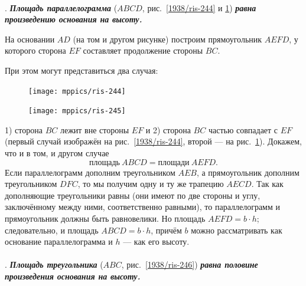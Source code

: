 \documentclass[twoside]{book}
\begin{document}
\paragraph{}\label{1938/247}
.
\textbf{\emph{Площадь параллелограмма}} ($ABCD$, рис.~\ref{1938/ris-244} и \ref{1938/ris-245}) \textbf{\emph{равна произведению основания на высоту.}}

На основании $AD$ (на том и другом рисунке) построим прямоугольник $AEFD$, у которого сторона $EF$ составляет продолжение стороны $BC$.

При этом могут представиться два случая:

\begin{figure}[h]
\begin{minipage}{.58\textwidth}
\centering
\texttt{[image: mppics/ris-244]}
\end{minipage}
\hfill
\begin{minipage}{.38\textwidth}
\centering
\texttt{[image: mppics/ris-245]}
\end{minipage}

\medskip

\begin{minipage}{.58\textwidth}
\centering
\caption{}\label{1938/ris-244}
\end{minipage}
\hfill
\begin{minipage}{.38\textwidth}
\centering
\caption{}\label{1938/ris-245}
\end{minipage}
\vskip-4mm
\end{figure}

1) сторона $BC$ лежит вне стороны $EF$ и 2) сторона $BC$ частью совпадает с $EF$ (первый случай изображён на рис.~\ref{1938/ris-244}, второй — на рис.~\ref{1938/ris-245}).
Докажем, что и в том, и другом случае
\[\text{площадь}~ABCD = \text{площади}~AEFD.\]
Если параллелограмм дополним треугольником $AEB$, а прямоугольник дополним треугольником $DFC$, то мы получим одну и ту же трапецию $AECD$.
Так как дополняющие треугольники равны (они имеют по две стороны и углу, заключённому между ними, соответственно равными), то параллелограмм и прямоугольник должны быть равновелики.
Но площадь $AEFD=b\cdot h$;
следовательно, и площадь $ABCD=b\cdot h$, причём $b$ можно рассматривать как основание параллелограмма и $h$ — как его высоту.


\paragraph{}\label{1938/248}
.
\textbf{\emph{Площадь треугольника}} ($ABC$, рис.~\ref{1938/ris-246}) \textbf{\emph{равна половине произведения основания на высоту.}}
\end{document}
